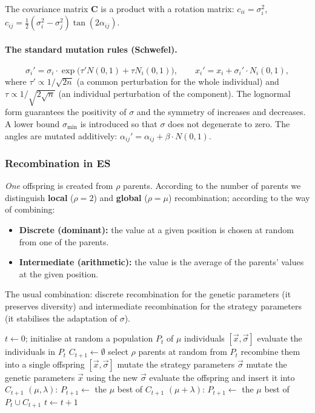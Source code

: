 \documentclass[11pt,a4paper]{article}
\theoremstyle{definition}
\begin{document}
The covariance matrix $\mathbf{C}$ is a product with a rotation matrix:
$c_{ii} = \sigma_i^2$,
$c_{ij} = \tfrac12(\sigma_i^2 - \sigma_j^2)\tan(2\alpha_{ij})$.

\paragraph{The standard mutation rules (Schwefel).}
\[
\sigma_i' = \sigma_i \cdot \exp\big(\tau' N(0,1) + \tau N_i(0,1)\big),
\qquad
x_i' = x_i + \sigma_i' \cdot N_i(0,1),
\]
where $\tau' \propto 1/\sqrt{2n}$ (a common perturbation for the whole
individual) and $\tau \propto 1/\sqrt{2\sqrt{n}}$ (an individual perturbation of
the component). The lognormal form guarantees the positivity of $\sigma$ and the
symmetry of increases and decreases. A lower bound $\sigma_{\min}$ is introduced
so that $\sigma$ does not degenerate to zero. The angles are mutated additively:
$\alpha_{ij}' = \alpha_{ij} + \beta \cdot N(0,1)$.

\subsubsection{Recombination in ES}

\emph{One} offspring is created from $\rho$ parents. According to the number of
parents we distinguish \textbf{local} ($\rho = 2$) and \textbf{global}
($\rho = \mu$) recombination; according to the way of combining:
\begin{itemize}
\item \textbf{Discrete (dominant):} the value at a given position is chosen at
  random from one of the parents.
\item \textbf{Intermediate (arithmetic):} the value is the average of the
  parents' values at the given position.
\end{itemize}
The usual combination: discrete recombination for the genetic parameters (it
preserves diversity) and intermediate recombination for the strategy parameters
(it stabilises the adaptation of $\sigma$).

\begin{algorithm}[!ht]
\caption{The general ES cycle}
\begin{algorithmic}[1]
\State $t \gets 0$; initialise at random a population $P_t$ of $\mu$ individuals $[\vec x, \vec\sigma]$
\State evaluate the individuals in $P_t$
  \State $C_{t+1} \gets \emptyset$
    \State select $\rho$ parents at random from $P_t$
    \State recombine them into a single offspring $[\vec x, \vec\sigma]$
    \State mutate the strategy parameters $\vec\sigma$
    \State mutate the genetic parameters $\vec x$ using the new $\vec\sigma$
    \State evaluate the offspring and insert it into $C_{t+1}$
  \EndFor
  \State $(\mu,\lambda)$: $P_{t+1} \gets$ the $\mu$ best of $C_{t+1}$
  \State $(\mu+\lambda)$: $P_{t+1} \gets$ the $\mu$ best of $P_t \cup C_{t+1}$
  \State $t \gets t+1$
\EndWhile
\end{algorithmic}
\end{algorithm}
\end{document}
